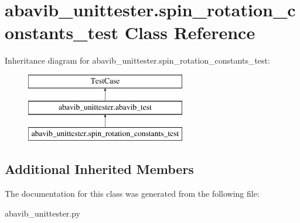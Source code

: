 \hypertarget{classabavib__unittester_1_1spin__rotation__constants__test}{\section{abavib\+\_\+unittester.\+spin\+\_\+rotation\+\_\+constants\+\_\+test Class Reference}
\label{classabavib__unittester_1_1spin__rotation__constants__test}
}
Inheritance diagram for abavib\+\_\+unittester.\+spin\+\_\+rotation\+\_\+constants\+\_\+test\+:\begin{figure}[H]
\begin{center}
\leavevmode
\includegraphics[height=3.000000cm]{classabavib__unittester_1_1spin__rotation__constants__test}
\end{center}
\end{figure}
\subsection*{Additional Inherited Members}


The documentation for this class was generated from the following file\+:\begin{DoxyCompactItemize}
\item 
abavib\+\_\+unittester.\+py\end{DoxyCompactItemize}
